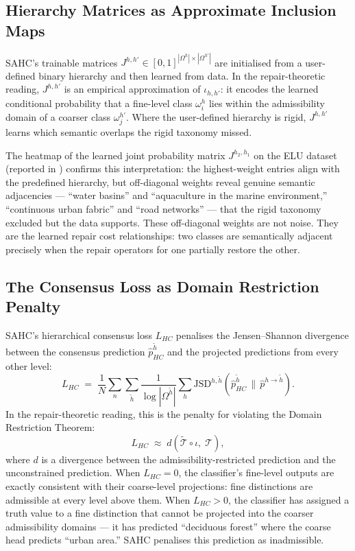 \documentclass[12pt, oneside]{article}
\theoremstyle{plain}
\theoremstyle{definition}
\theoremstyle{remark}
\newcommand{\iotamap}{\iota}        %
\begin{document}
\subsection{Hierarchy Matrices as Approximate Inclusion Maps}

SAHC's trainable matrices $J^{h,h'} \in [0,1]^{|\Omega^h|
\times |\Omega^{h'}|}$ are initialised from a user-defined binary
hierarchy and then learned from data.
In the repair-theoretic reading, $J^{h,h'}$ is an empirical
approximation of $\iotamap_{h,h'}$: it encodes the learned
conditional probability that a fine-level class $\omega^h_i$
lies within the admissibility domain of a coarser class
$\omega^{h'}_j$.
Where the user-defined hierarchy is rigid, $J^{h,h'}$ learns
which semantic overlaps the rigid taxonomy missed.

The heatmap of the learned joint probability matrix
$J^{h_2,h_1}$ on the ELU dataset (reported in \cite{Weikmann2026})
confirms this interpretation: the highest-weight entries align
with the predefined hierarchy, but off-diagonal weights reveal
genuine semantic adjacencies --- ``water basins'' and
``aquaculture in the marine environment,'' ``continuous urban
fabric'' and ``road networks'' --- that the rigid taxonomy
excluded but the data supports.
These off-diagonal weights are not noise.
They are the learned repair cost relationships: two classes
are semantically adjacent precisely when the repair operators
for one partially restore the other.

\subsection{The Consensus Loss as Domain Restriction Penalty}

SAHC's hierarchical consensus loss $L_{HC}$ penalises the
Jensen--Shannon divergence between the consensus prediction
$\hat{p}^{\tilde{h}}_{HC}$ and the projected predictions from
every other level:
\[
  L_{HC}
  \;=\;
  \frac{1}{N} \sum_n \sum_{\tilde{h}} \frac{1}{\log|\Omega^{\tilde{h}}|}
  \sum_h \mathrm{JSD}^{h,\tilde{h}}(\hat{p}^{\tilde{h}}_{HC} \,\|\,
  \hat{p}^{h \to \tilde{h}}).
\]
In the repair-theoretic reading, this is the penalty for
violating the Domain Restriction Theorem:
\[
  L_{HC}
  \;\approx\;
  d\!\left(
    \widetilde{\mathcal{T}} \circ \iotamap,\;
    \mathcal{T}
  \right),
\]
where $d$ is a divergence between the admissibility-restricted
prediction and the unconstrained prediction.
When $L_{HC} = 0$, the classifier's fine-level outputs are
exactly consistent with their coarse-level projections:
fine distinctions are admissible at every level above them.
When $L_{HC} > 0$, the classifier has assigned a truth value
to a fine distinction that cannot be projected into the coarser
admissibility domains --- it has predicted ``deciduous forest''
where the coarse head predicts ``urban area.''
SAHC penalises this prediction as inadmissible.
\end{document}

